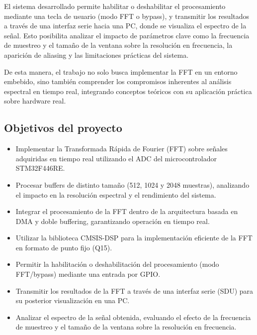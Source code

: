 \documentclass[12pt]{article}
\begin{document}
    El sistema desarrollado permite habilitar o deshabilitar el procesamiento mediante una tecla de usuario (modo FFT o bypass), y transmitir los resultados a través de una interfaz serie hacia una PC, donde se visualiza el espectro de la señal. Esto posibilita analizar el impacto de parámetros clave como la frecuencia de muestreo y el tamaño de la ventana sobre la resolución en frecuencia, la aparición de aliasing y las limitaciones prácticas del sistema.

    De esta manera, el trabajo no solo busca implementar la FFT en un entorno embebido, sino también comprender los compromisos inherentes al análisis espectral en tiempo real, integrando conceptos teóricos con su aplicación práctica sobre hardware real.

	\subsection{Objetivos del proyecto}
	
	\begin{itemize}
    \item Implementar la Transformada Rápida de Fourier (FFT) sobre señales adquiridas en tiempo real utilizando el ADC del microcontrolador STM32F446RE.
    
    \item Procesar buffers de distinto tamaño (512, 1024 y 2048 muestras), analizando el impacto en la resolución espectral y el rendimiento del sistema.
    
    \item Integrar el procesamiento de la FFT dentro de la arquitectura basada en DMA y doble buffering, garantizando operación en tiempo real.
    
    \item Utilizar la biblioteca CMSIS-DSP para la implementación eficiente de la FFT en formato de punto fijo (Q15).
    
    \item Permitir la habilitación o deshabilitación del procesamiento (modo FFT/bypass) mediante una entrada por GPIO.
    
    \item Transmitir los resultados de la FFT a través de una interfaz serie (SDU) para su posterior visualización en una PC.
    
    \item Analizar el espectro de la señal obtenida, evaluando el efecto de la frecuencia de muestreo y el tamaño de la ventana sobre la resolución en frecuencia.
    
    \end{itemize}
	
\end{document}
